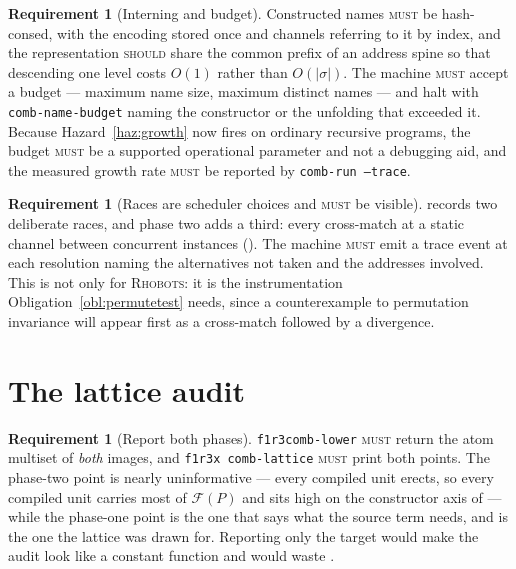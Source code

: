 \documentclass[11pt,a4paper]{article}
\newcommand{\code}[1]{\texttt{#1}}
\newcommand{\Rhobots}{\textsc{Rhobots}}
\newcommand{\MUST}{\textsc{must}}
\newcommand{\SHOULD}{\textsc{should}}
\theoremstyle{definition}
\newtheorem{requirement}[definition]{Requirement}
\theoremstyle{plain}
\begin{document}
\begin{requirement}[Interning and budget]\label{req:intern}
Constructed names \MUST{} be hash-consed, with the encoding stored once and
channels referring to it by index, and the representation \SHOULD{} share the
common prefix of an address spine so that descending one level costs $O(1)$
rather than $O(|\sigma|)$. The machine \MUST{} accept a budget --- maximum
name size, maximum distinct names --- and halt with
\code{comb-name-budget} naming the constructor or the unfolding that exceeded
it. Because Hazard~\ref{haz:growth} now fires on ordinary recursive programs,
the budget \MUST{} be a supported operational parameter and not a debugging
aid, and the measured growth rate \MUST{} be reported by
\code{comb-run --trace}.
\end{requirement}

\begin{requirement}[Races are scheduler choices and \MUST{} be visible]
\label{req:races}
\cite[\S3.3]{draft3} records two deliberate races, and phase two adds a third:
every cross-match at a static channel between concurrent instances
(\cite[Rem.~6.10]{draft3}). The machine \MUST{} emit a trace event at each
resolution naming the alternatives not taken and the addresses involved. This
is not only for \Rhobots: it is the instrumentation
Obligation~\ref{obl:permutetest} needs, since a counterexample to permutation
invariance will appear first as a cross-match followed by a divergence.
\end{requirement}

\section{The lattice audit}\label{sec:lattice}

\begin{requirement}[Report both phases]\label{req:lattice}
\code{f1r3comb-lower} \MUST{} return the atom multiset of \emph{both} images,
and \code{f1r3x comb-lattice} \MUST{} print both points. The phase-two point
is nearly uninformative --- every compiled unit erects, so every compiled unit
carries most of $\mathcal{F}(P)$ and sits high on the constructor axis of
\cite[\S9]{draft3} --- while the phase-one point is the one that says what the
source term needs, and is the one the lattice was drawn for. Reporting only
the target would make the audit look like a constant function and would waste
\cite[Thm.~6.5]{logic}.
\end{requirement}
\end{document}
